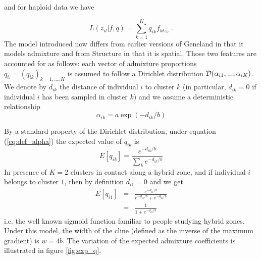 \documentclass{article}
\begin{document}
and for haploid data we have

\begin{equation}\label{eq:admix_like}
L(z_{il} | f,q) = \sum_{k=1}^K q_{ik} f_{klz_{il}}\;.
\end{equation}
The model introduced now differs from earlier versions of {\sc Geneland} in that it  models admixture 
and from {\sc Structure} in that it is spatial. Those two features are accounted for as follows:
each vector of admixture proportions $q_{i.}=(q_{ik})_{k=1,...,K}$ is assumed to follow a  
Dirichlet distribution ${\cal D}(\alpha_{i1},...,\alpha_{iK})$.
We denote by $d_{ik}$ the distance of individual $i$ to cluster $k$ (in particular,  $d_{ik}=0$ 
if individual $i$ has been sampled in cluster $k$) 
and we assume a deterministic  relationship 
\begin{equation}\label{eq:def_alpha}
\alpha_{ik} = a\exp(-d_{ik}/b)
\end{equation}


By a standard property of the Dirichlet distribution, under equation (\ref{eq:def_alpha}) the expected value of $q_{ik}$ is 
\begin{equation}\label{eq:expect_q}
  E[q_{ik}] = \frac{e^{-d_{ik}/b}}{\sum_k e^{-d_{ik}/b}}
\end{equation}
In presence of $K=2$ clusters in contact along a hybrid zone, 
and if individual $i$ belongs to cluster $1$, 
then by definition $d_{i1}=0$ and we get 
\begin{eqnarray}
  E[q_{i1}] & = & \frac{e^{-d_{i1}/b}}{e^{-d_{i1}/b}+e^{-d_{i2}/b}} \nonumber \\
 & = & \frac{1}{1+e^{-d_{i2}/b}} \label{eq:expect_q_K=2}
\end{eqnarray}
i.e. the well known sigmoid function familiar to people studying hybrid zones.
Under this model, the width of the cline (defined as the inverse of the maximum gradient) is $w=4b$.
The variation of the expected admixture coefficients is illustrated in figure \ref{fig:exp_q}.
\end{document}
